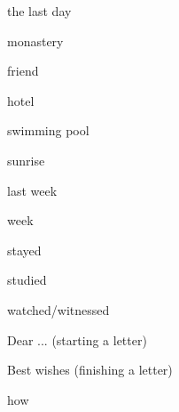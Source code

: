 \begin{flashcard}{\LARGE the last day}
\LARGE {}
\end{flashcard}
\begin{flashcard}{\LARGE monastery}
\LARGE {}
\end{flashcard}
\begin{flashcard}{\LARGE friend}
\LARGE {}
\end{flashcard}
\begin{flashcard}{\LARGE hotel}
\LARGE {}
\end{flashcard}
\begin{flashcard}{\LARGE swimming pool}
\LARGE {}
\end{flashcard}
\begin{flashcard}{\LARGE sunrise}
\LARGE {}
\end{flashcard}
\begin{flashcard}{\LARGE last week}
\LARGE {}
\end{flashcard}
\begin{flashcard}{\LARGE week}
\LARGE {}
\end{flashcard}
\begin{flashcard}{\LARGE stayed}
\LARGE {}
\end{flashcard}
\begin{flashcard}{\LARGE studied}
\LARGE {}
\end{flashcard}
\begin{flashcard}{\LARGE watched/witnessed}
\LARGE {}
\end{flashcard}
\begin{flashcard}{\LARGE Dear ... (starting a letter)}
\LARGE {}
\end{flashcard}
\begin{flashcard}{\LARGE Best wishes (finishing a letter)}
\LARGE {}
\end{flashcard}
\begin{flashcard}{\LARGE how}
\LARGE {}
\end{flashcard}
